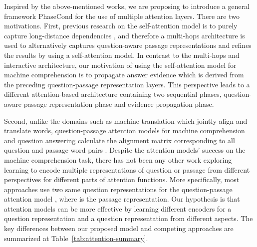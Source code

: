 \documentclass{article} \usepackage{arxiv, times}
\begin{document}
Inspired by the above-mentioned works, we are proposing to introduce a general framework PhaseCond for the use of multiple attention layers. There are two motivations. 
First, previous research on the self-attention model is to purely capture long-distance dependencies \citep{VaswaniSPUJGKP17}, and therefore a multi-hops architecture \citep{hureinforced, PanLZCCH17} is used to alternatively captures question-aware passage representations and refines the results by using a self-attention model.
In contrast to the multi-hops and interactive architecture, our motivation of using the self-attention model for machine comprehension is to propagate answer evidence which is derived from the preceding question-passage representation layers. This perspective leads to a different attention-based architecture containing two sequential phases, question-aware passage representation phase and evidence propagation phase. 

Second, unlike the domains such as machine translation \citep{bahdanau2014neural} which jointly align and translate words, question-passage attention models for machine comprehension and question answering calculate the alignment matrix corresponding to all question and passage word pairs \citep{wang2016machine, seo2016bidirectional}. Despite the attention models' success on the machine comprehension task, there has not been any other work exploring learning to encode multiple representations of question or passage from different perspectives for different parts of attention functions.
More specifically, most approaches use two same question representations  for the question-passage attention model , where  is the passage representation. Our hypothesis is that attention models can be more effective by learning different encoders for a question representation  and a question representation  from different aspects. The key differences between our proposed model and competing approaches are summarized at Table~\ref{tab:attention-summary}.  
\end{document}
